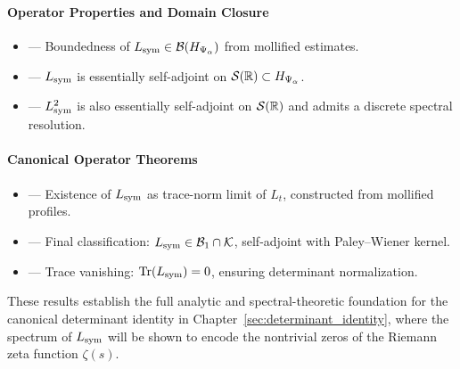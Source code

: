 \paragraph{Operator Properties and Domain Closure}
\begin{itemize}
  \item {} — Boundedness of \( L_{\mathrm{sym}} \in \mathcal{B}(H_{\Psi_\alpha}) \) from mollified estimates.
  \item {} — \( L_{\mathrm{sym}} \) is essentially self-adjoint on \( \mathcal{S}(\mathbb{R}) \subset H_{\Psi_\alpha} \).
  \item {} — \( L_{\mathrm{sym}}^2 \) is also essentially self-adjoint on \( \mathcal{S}(\mathbb{R}) \) and admits a discrete spectral resolution.
\end{itemize}

\paragraph{Canonical Operator Theorems}
\begin{itemize}
  \item {} — Existence of \( L_{\mathrm{sym}} \) as trace-norm limit of \( L_t \), constructed from mollified profiles.
  \item {} — Final classification: \( L_{\mathrm{sym}} \in \mathcal{B}_1 \cap \mathcal{K} \), self-adjoint with Paley–Wiener kernel.
  \item {} — Trace vanishing: \( \operatorname{Tr}(L_{\mathrm{sym}}) = 0 \), ensuring determinant normalization.
\end{itemize}

\medskip
\noindent
These results establish the full analytic and spectral-theoretic foundation for the canonical determinant identity in Chapter~\ref{sec:determinant_identity}, where the spectrum of \( L_{\mathrm{sym}} \) will be shown to encode the nontrivial zeros of the Riemann zeta function \( \zeta(s) \).
